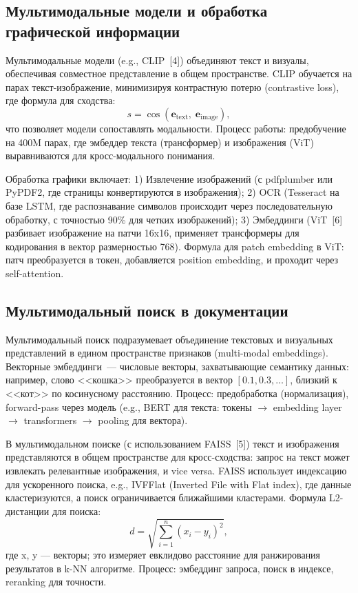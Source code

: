 \documentclass[a4paper,12pt]{article}
\begin{document}
\subsection{Мультимодальные модели и обработка графической информации}

Мультимодальные модели (e.g., CLIP~[4]) объединяют текст и визуалы, обеспечивая совместное представление в общем пространстве. CLIP обучается на парах текст-изображение, минимизируя контрастную потерю (contrastive loss), где формула для сходства:
\[
s = \cos(\mathbf{e}_{\mathrm{text}},\; \mathbf{e}_{\mathrm{image}}),
\]
что позволяет модели сопоставлять модальности. Процесс работы: предобучение на 400M парах, где эмбеддер текста (трансформер) и изображения (ViT) выравниваются для кросс-модального понимания.

Обработка графики включает: 1) Извлечение изображений (с pdfplumber или PyPDF2, где страницы конвертируются в изображения); 2) OCR (Tesseract на базе LSTM, где распознавание символов происходит через последовательную обработку, с точностью 90\% для четких изображений); 3) Эмбеддинги (ViT~[6] разбивает изображение на патчи 16x16, применяет трансформеры для кодирования в вектор размерностью 768). Формула для patch embedding в ViT: патч преобразуется в токен, добавляется position embedding, и проходит через self-attention.

\subsection{Мультимодальный поиск в документации}

Мультимодальный поиск подразумевает объединение текстовых и визуальных представлений в едином пространстве признаков (multi-modal embeddings). Векторные эмбеддинги~--- числовые векторы, захватывающие семантику данных: например, слово <<кошка>> преобразуется в вектор $[0.1, 0.3, \dots]$, близкий к <<кот>> по косинусному расстоянию. Процесс: предобработка (нормализация), forward-pass через модель (e.g., BERT для текста: токены $\rightarrow$ embedding layer $\rightarrow$ transformers $\rightarrow$ pooling для вектора).

В мультимодальном поиске (с использованием FAISS~[5]) текст и изображения представляются в общем пространстве для кросс-сходства: запрос на текст может извлекать релевантные изображения, и vice versa. FAISS использует индексацию для ускоренного поиска, e.g., IVFFlat (Inverted File with Flat index), где данные кластеризуются, а поиск ограничивается ближайшими кластерами. Формула L2-дистанции для поиска: 
\[
d = \sqrt{\sum_{i=1}^{n} (x_i - y_i)^2},
\]
где x, y --- векторы; это измеряет евклидово расстояние для ранжирования результатов в k-NN алгоритме. Процесс: эмбеддинг запроса, поиск в индексе, reranking для точности.
\end{document}
